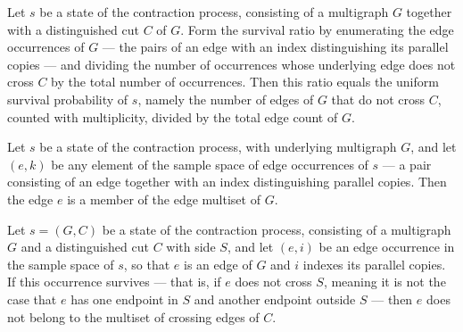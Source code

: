 \begin{lemma}
\label{KargerTrace.edgeChoiceSurvivalRatio_eq_uniformSurvivalProb}
\leanok
{}
Let $s$ be a state of the contraction process, consisting of a multigraph $G$ together
with a distinguished cut $C$ of $G$. Form the survival ratio by enumerating the edge
occurrences of $G$ — the pairs of an edge with an index distinguishing its parallel
copies — and dividing the number of occurrences whose underlying edge does not cross $C$
by the total number of occurrences. Then this ratio equals the uniform survival
probability of $s$, namely the number of edges of $G$ that do not cross $C$, counted
with multiplicity, divided by the total edge count of $G$.
\end{lemma}

\begin{lemma}
\label{KargerTrace.edgeChoice_mem_edges}
\leanok
{}
Let $s$ be a state of the contraction process, with underlying multigraph $G$, and let
$(e, k)$ be any element of the sample space of edge occurrences of $s$ — a pair
consisting of an edge together with an index distinguishing parallel copies. Then the
edge $e$ is a member of the edge multiset of $G$.
\end{lemma}

\begin{lemma}
\label{KargerTrace.not_mem_crossingEdges_of_edgeChoiceSurvives}
\leanok
{}
Let $s = (G, C)$ be a state of the contraction process, consisting of a multigraph $G$
and a distinguished cut $C$ with side $S$, and let $(e, i)$ be an edge occurrence in the
sample space of $s$, so that $e$ is an edge of $G$ and $i$ indexes its parallel copies.
If this occurrence survives — that is, if $e$ does not cross $S$, meaning it is not the
case that $e$ has one endpoint in $S$ and another endpoint outside $S$ — then $e$ does
not belong to the multiset of crossing edges of $C$.
\end{lemma}

